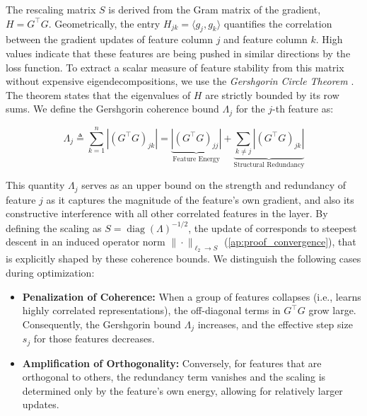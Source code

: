         The rescaling matrix $S$ is derived from the Gram matrix of the gradient, $H = G^\top G$. Geometrically, the entry $H_{jk} = \langle g_j, g_k \rangle$ quantifies the correlation between the gradient updates of feature column $j$ and feature column $k$. High values indicate that these features are being pushed in similar directions by the loss function.
        To extract a scalar measure of feature stability from this matrix without expensive eigendecompositions, we use the \textit{Gershgorin Circle Theorem} \citep{gershgorin1931uber}. The theorem states that the eigenvalues of $H$ are strictly bounded by its row sums. We define the Gershgorin coherence bound $\Lambda_j$ for the $j$-th feature as:
        
        \begin{equation}
            \Lambda_j \triangleq \sum_{k=1}^n |(G^\top G)_{jk}| = \underbrace{|(G^\top G)_{jj}|}_{\text{Feature Energy}} + \underbrace{\sum_{k \ne j} |(G^\top G)_{jk}|}_{\text{Structural Redundancy}}
        \end{equation}
        
        This quantity $\Lambda_j$ serves as an upper bound on the strength and redundancy of feature $j$ as it captures the magnitude of the feature's own gradient, and also its constructive interference with all other correlated features in the layer.
        By defining the scaling as $S = \operatorname{diag}(\Lambda)^{-1/2}$, the update of \turbomuon{}
        corresponds to steepest descent in an induced operator norm $\| \cdot \|_{\ell_2 \rightarrow S}$ (\cref{ap:proof_convergence}), that is explicitly shaped by these coherence bounds. We distinguish the following cases during optimization:
        
        \begin{itemize}
            \item \textbf{Penalization of Coherence:} When a group of features collapses (i.e., learns highly correlated representations), the off-diagonal terms in $G^\top G$ grow large. Consequently, the Gershgorin bound $\Lambda_j$ increases, and the effective step size $s_j$ for those features decreases. 
            \item \textbf{Amplification of Orthogonality:} Conversely, for features that are orthogonal to others, the redundancy term vanishes and the scaling is determined only by the feature's own energy, allowing for relatively larger updates.
        \end{itemize}
        
